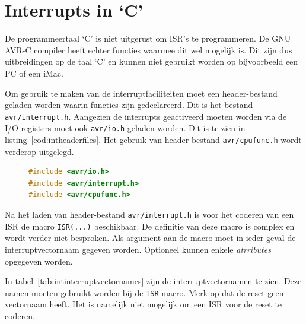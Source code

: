 \section{Interrupts in `C'}
De programmeertaal `C' is niet uitgerust om ISR's te programmeren. De GNU
AVR-C compiler heeft echter functies waarmee dit wel mogelijk is. Dit zijn dus
uitbreidingen op de taal `C' en kunnen niet gebruikt worden op bijvoorbeeld een
PC of een iMac.

Om gebruik te maken van de interruptfaciliteiten moet een header-bestand
geladen worden waarin functies zijn gedeclareerd. Dit is het bestand
\lstinline|avr/interrupt.h|. Aangezien de interrupts geactiveerd moeten worden
via de I/O-registers moet ook \lstinline|avr/io.h| geladen worden. Dit is te
zien in listing~\ref{cod:intheaderfiles}. Het gebruik van header-bestand
\lstinline|avr/cpufunc.h| wordt verderop uitgelegd.

\begin{figure}[!ht]
\begin{lstlisting}[language=C,caption=Header-bestanden voor het gebruik van interrupts.,label=cod:intheaderfiles]
#include <avr/io.h>
#include <avr/interrupt.h>
#include <avr/cpufunc.h>
\end{lstlisting}
\end{figure}

Na het laden van header-bestand \lstinline|avr/interrupt.h| is voor het
coderen van een ISR de macro \lstinline|ISR(...)| beschikbaar. De definitie
van deze macro is complex en wordt verder niet besproken. Als argument aan
de macro moet in ieder geval de interruptvectornaam gegeven worden. Optioneel
kunnen enkele \textsl{atrributes} opgegeven worden.


In tabel~\ref{tab:intinterruptvectornames} zijn de interruptvectornamen te
zien. Deze namen moeten gebruikt worden bij de \lstinline|ISR|-macro.
Merk op dat de reset geen vectornaam heeft. Het is namelijk niet
mogelijk om een ISR voor de reset te coderen.

